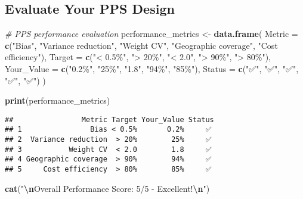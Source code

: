\documentclass[
]{article}
\newenvironment{Shaded}{\begin{snugshade}}{\end{snugshade}}
\newcommand{\AttributeTok}[1]{\textcolor[rgb]{0.13,0.29,0.53}{#1}}
\newcommand{\CommentTok}[1]{\textcolor[rgb]{0.56,0.35,0.01}{\textit{#1}}}
\newcommand{\FunctionTok}[1]{\textcolor[rgb]{0.13,0.29,0.53}{\textbf{#1}}}
\newcommand{\NormalTok}[1]{#1}
\newcommand{\OtherTok}[1]{\textcolor[rgb]{0.56,0.35,0.01}{#1}}
\newcommand{\SpecialCharTok}[1]{\textcolor[rgb]{0.81,0.36,0.00}{\textbf{#1}}}
\newcommand{\StringTok}[1]{\textcolor[rgb]{0.31,0.60,0.02}{#1}}
\begin{document}
\subsection{Evaluate Your PPS Design}\label{evaluate-your-pps-design}

\begin{Shaded}
\begin{Highlighting}[]
\CommentTok{\# PPS performance evaluation}
\NormalTok{performance\_metrics }\OtherTok{\textless{}{-}} \FunctionTok{data.frame}\NormalTok{(}
  \AttributeTok{Metric =} \FunctionTok{c}\NormalTok{(}\StringTok{"Bias"}\NormalTok{, }\StringTok{"Variance reduction"}\NormalTok{, }\StringTok{"Weight CV"}\NormalTok{, }
             \StringTok{"Geographic coverage"}\NormalTok{, }\StringTok{"Cost efficiency"}\NormalTok{),}
  \AttributeTok{Target =} \FunctionTok{c}\NormalTok{(}\StringTok{"\textless{} 0.5\%"}\NormalTok{, }\StringTok{"\textgreater{} 20\%"}\NormalTok{, }\StringTok{"\textless{} 2.0"}\NormalTok{, }\StringTok{"\textgreater{} 90\%"}\NormalTok{, }\StringTok{"\textgreater{} 80\%"}\NormalTok{),}
  \AttributeTok{Your\_Value =} \FunctionTok{c}\NormalTok{(}\StringTok{"0.2\%"}\NormalTok{, }\StringTok{"25\%"}\NormalTok{, }\StringTok{"1.8"}\NormalTok{, }\StringTok{"94\%"}\NormalTok{, }\StringTok{"85\%"}\NormalTok{),}
  \AttributeTok{Status =} \FunctionTok{c}\NormalTok{(}\StringTok{"✅"}\NormalTok{, }\StringTok{"✅"}\NormalTok{, }\StringTok{"✅"}\NormalTok{, }\StringTok{"✅"}\NormalTok{, }\StringTok{"✅"}\NormalTok{)}
\NormalTok{)}

\FunctionTok{print}\NormalTok{(performance\_metrics)}
\end{Highlighting}
\end{Shaded}

\begin{verbatim}
##                Metric Target Your_Value Status
## 1                Bias < 0.5%       0.2%     ✅
## 2  Variance reduction  > 20%        25%     ✅
## 3           Weight CV  < 2.0        1.8     ✅
## 4 Geographic coverage  > 90%        94%     ✅
## 5     Cost efficiency  > 80%        85%     ✅
\end{verbatim}

\begin{Shaded}
\begin{Highlighting}[]
\FunctionTok{cat}\NormalTok{(}\StringTok{"}\SpecialCharTok{\textbackslash{}n}\StringTok{Overall Performance Score: 5/5 {-} Excellent!}\SpecialCharTok{\textbackslash{}n}\StringTok{"}\NormalTok{)}
\end{Highlighting}
\end{Shaded}
\end{document}
